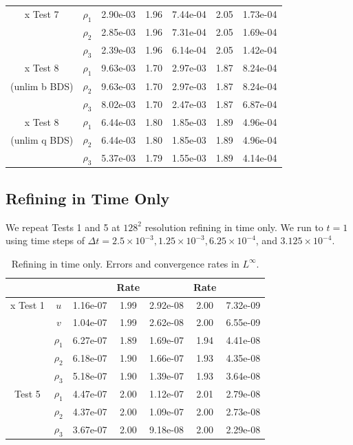 \documentclass[final]{siamltex}
\begin{document}
\begin{table}[h]
\begin{center}
\begin{tabular}{ccccccc}
\hline
x Test 7            & $\rho_1$ & 2.90e-03 & 1.96 & 7.44e-04 & 2.05 & 1.73e-04 \\
                    & $\rho_2$ & 2.85e-03 & 1.96 & 7.31e-04 & 2.05 & 1.69e-04 \\
                    & $\rho_3$ & 2.39e-03 & 1.96 & 6.14e-04 & 2.05 & 1.42e-04 \\
\hline
x Test 8            & $\rho_1$ & 9.63e-03 & 1.70 & 2.97e-03 & 1.87 & 8.24e-04 \\
(unlim b BDS)       & $\rho_2$ & 9.63e-03 & 1.70 & 2.97e-03 & 1.87 & 8.24e-04 \\
                    & $\rho_3$ & 8.02e-03 & 1.70 & 2.47e-03 & 1.87 & 6.87e-04 \\
\hline
x Test 8            & $\rho_1$ & 6.44e-03 & 1.80 & 1.85e-03 & 1.89 & 4.96e-04 \\
(unlim q BDS)       & $\rho_2$ & 6.44e-03 & 1.80 & 1.85e-03 & 1.89 & 4.96e-04 \\
                    & $\rho_3$ & 5.37e-03 & 1.79 & 1.55e-03 & 1.89 & 4.14e-04
\end{tabular}
\end{center}
\end{table}

\subsection{Refining in Time Only}
We repeat Tests 1 and 5 at $128^2$ resolution refining in time only.  We run to $t=1$ using time steps
of $\Delta t = 2.5\times 10^{-3}, 1.25\times 10^{-3}, 6.25\times 10^{-4}$, and $3.125\times 10^{-4}$.
\begin{table}[h]
\begin{center}
\caption{Refining in time only.  Errors and convergence rates in $L^\infty$.}
\label{tab:Linf_time}
\begin{tabular}{ccccccc}
& & & Rate & & Rate & \\
\hline
x Test 1            & $u$      & 1.16e-07 & 1.99 & 2.92e-08 & 2.00 & 7.32e-09 \\
                    & $v$      & 1.04e-07 & 1.99 & 2.62e-08 & 2.00 & 6.55e-09 \\
                    & $\rho_1$ & 6.27e-07 & 1.89 & 1.69e-07 & 1.94 & 4.41e-08 \\
                    & $\rho_2$ & 6.18e-07 & 1.90 & 1.66e-07 & 1.93 & 4.35e-08 \\
                    & $\rho_3$ & 5.18e-07 & 1.90 & 1.39e-07 & 1.93 & 3.64e-08 \\
\hline
Test 5              & $\rho_1$ & 4.47e-07 & 2.00 & 1.12e-07 & 2.01 & 2.79e-08 \\
                    & $\rho_2$ & 4.37e-07 & 2.00 & 1.09e-07 & 2.00 & 2.73e-08 \\
                    & $\rho_3$ & 3.67e-07 & 2.00 & 9.18e-08 & 2.00 & 2.29e-08 \\
\end{tabular}
\end{center}
\end{table}
\end{document}
